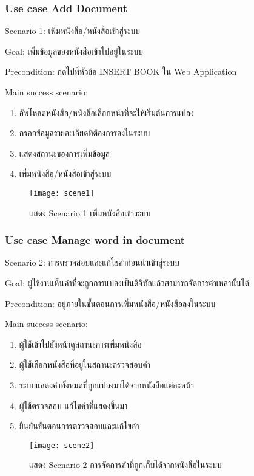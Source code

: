\subsubsection{Use case Add Document}

Scenario 1: เพิ่มหนังสือ/หนังสือเข้าสู่ระบบ

Goal: เพิ่มข้อมูลของหนังสือเข้าไปอยู่ในระบบ

Precondition: กดไปที่หัวข้อ INSERT BOOK ใน Web Application 

Main success scenario:

\begin{enumerate}
    \item อัพโหลดหนังสือ/หนังสือเลือกหน้าที่จะให้เริ่มต้นการแปลง
    \item กรอกข้อมูลรายละเอียดที่ต้องการลงในระบบ
    \item แสดงสถานะของการเพิ่มข้อมูล
    \item เพิ่มหนังสือ/หนังสือเข้าสู่ระบบ
\end{enumerate}

\begin{figure}[H]
    \centering
    \texttt{[image: scene1]}
    \caption{แสดง Scenario 1 เพิ่มหนังสือเข้าระบบ}\label{fig:scene1}
\end{figure}

\subsubsection{Use case Manage word in document}

Scenario 2: การตรวจสอบและแก้ไขคำก่อนนำเข้าสู่ระบบ

Goal: ผู้ใช้งานเห็นคำที่จะถูกการแปลงเป็นดิจิทัลแล้วสามารถจัดการคำเหล่านั้นได้

Precondition: อยู่ภายในขั้นตอนการเพิ่มหนังสือ/หนังสือลงในระบบ

Main success scenario:

\begin{enumerate}
    \item ผู้ใช้เข้าไปยังหน้าดูสถานะการเพิ่มหนังสือ
    \item ผู้ใช้เลือกหนังสือที่อยู่ในสถานะตรวจสอบคำ
    \item ระบบแสดงคำทั้งหมดที่ถูกแปลงมาได้จากหนังสือแต่ละหน้า
    \item ผู้ใช้ตรวจสอบ แก้ไขคำที่แสดงขึ้นมา
    \item ยืนยันขั้นตอนการตรวจสอบและแก้ไขคำ
\end{enumerate}
\begin{figure}[H]
    \centering
    \texttt{[image: scene2]}
    \caption{แสดง Scenario 2 การจัดการคำที่ถูกเก็บได้จากหนังสือในระบบ}\label{fig:scene2}
\end{figure}


